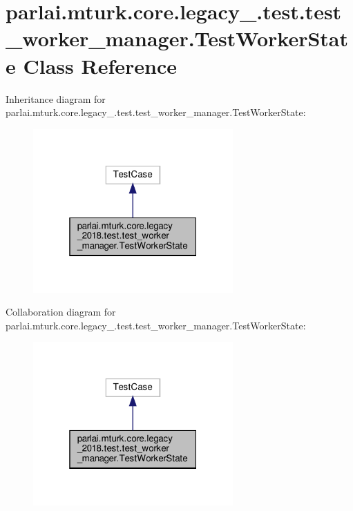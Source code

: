 \hypertarget{classparlai_1_1mturk_1_1core_1_1legacy__2018_1_1test_1_1test__worker__manager_1_1TestWorkerState}{}\section{parlai.\+mturk.\+core.\+legacy\+\_.\+test.\+test\+\_\+worker\+\_\+manager.\+Test\+Worker\+State Class Reference}
\label{classparlai_1_1mturk_1_1core_1_1legacy__2018_1_1test_1_1test__worker__manager_1_1TestWorkerState}


Inheritance diagram for parlai.\+mturk.\+core.\+legacy\+\_.\+test.\+test\+\_\+worker\+\_\+manager.\+Test\+Worker\+State\+:\nopagebreak
\begin{figure}[H]
\begin{center}
\leavevmode
\includegraphics[width=217pt]{da/d81/classparlai_1_1mturk_1_1core_1_1legacy__2018_1_1test_1_1test__worker__manager_1_1TestWorkerState__inherit__graph}
\end{center}
\end{figure}


Collaboration diagram for parlai.\+mturk.\+core.\+legacy\+\_.\+test.\+test\+\_\+worker\+\_\+manager.\+Test\+Worker\+State\+:\nopagebreak
\begin{figure}[H]
\begin{center}
\leavevmode
\includegraphics[width=217pt]{d6/d52/classparlai_1_1mturk_1_1core_1_1legacy__2018_1_1test_1_1test__worker__manager_1_1TestWorkerState__coll__graph}
\end{center}
\end{figure}
